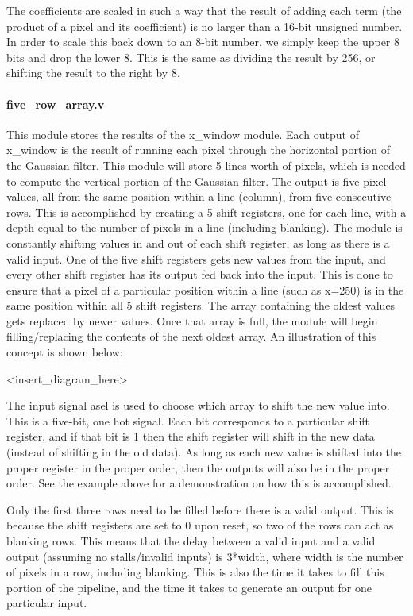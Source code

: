 \documentclass[12pt]{article}
\begin{document}
The coefficients are scaled in such a way that the result of adding each term 
(the product of a pixel and its coefficient) is no larger than a 16-bit unsigned 
number. In order to scale this back down to an 8-bit number, we simply keep the 
upper 8 bits and drop the lower 8. This is the same as dividing the result by 
256, or shifting the result to the right by 8.

\paragraph{five\_row\_array.v}
This module stores the results of the x\_window module. Each output of x\_window 
is the result of running each pixel through the horizontal portion of the 
Gaussian filter. This module will store 5 lines worth of pixels, which is needed 
to compute the vertical portion of the Gaussian filter. The output is five pixel 
values, all from the same position within a line (column), from five consecutive 
rows. This is accomplished by creating a 5 shift registers, one for each line, 
with a depth equal to the number of pixels in a line (including blanking).
The module is constantly shifting values in and out of each shift register, as 
long as there is a valid input. One of the five shift registers gets new values 
from the input, and every other shift register has its output fed back into the 
input. This is done to ensure that a pixel of a particular position within 
a line (such as x=250) is in the same position within all 5 shift registers. The 
array containing the oldest values gets replaced by newer values. Once that 
array is full, the module will begin filling/replacing the contents of the next 
oldest array. An illustration of this concept is shown below: 

<insert\_diagram\_here>

The input signal asel is used to choose which array to shift the new value into. 
This is a five-bit, one hot signal. Each bit corresponds to a particular 
shift register, and if that bit is 1 then the shift register will shift in the 
new data (instead of shifting in the old data). As long as each new value is 
shifted into the proper register in the proper order, then the outputs will also 
be in the proper order. See the example above for a demonstration on how this is 
accomplished.

Only the first three rows need to be filled before there is a valid output. This 
is because the shift registers are set to 0 upon reset, so two of the rows can 
act as blanking rows. This means that the delay between a valid input and 
a valid output (assuming no stalls/invalid inputs) is 3*width, where width is 
the number of pixels in a row, including blanking. This is also the time it 
takes to fill this portion of the pipeline, and the time it takes to generate an 
output for one particular input.
\end{document}
